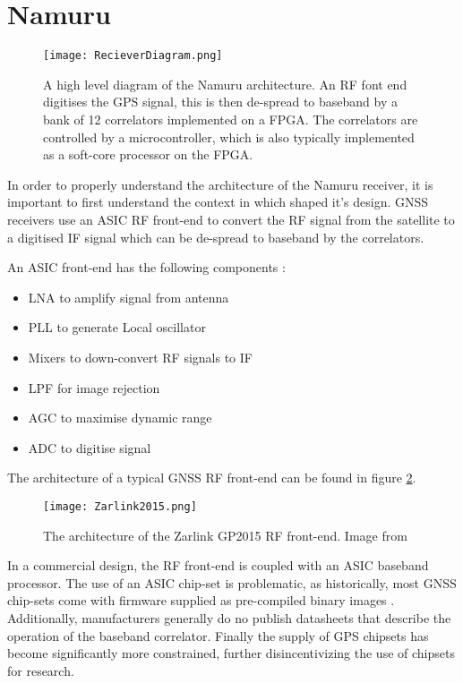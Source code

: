 \section{Namuru}
 

\begin{figure}[!htb] 
    \centering
    \texttt{[image: RecieverDiagram.png]} 
    \caption{A high level diagram of the Namuru architecture. An RF font end digitises the GPS signal, this is then de-spread to baseband by a bank of 12 correlators implemented on a FPGA. The correlators are controlled by a microcontroller, which is also typically implemented as a soft-core processor on the FPGA.}
    \label{fig:RecieverDiagram}
\end{figure}

In order to properly understand the architecture of the Namuru receiver, it is important to first understand the context in which shaped it's design. \ac{GNSS} receivers use an \ac{ASIC} RF front-end to convert the \ac{RF} signal from the satellite to a digitised \ac{IF} signal which can be de-spread to baseband by the correlators. 

An \ac{ASIC} front-end has the following components \cite{GlennonPresentation}: 

\begin{itemize}
\item{\ac{LNA} to amplify signal from antenna}
\item{\ac{PLL} to generate Local oscillator}
\item{Mixers to down-convert RF signals to IF}
\item{\ac{LPF} for image rejection}
\item{\ac{AGC} to maximise dynamic range}
\item{\ac{ADC} to digitise signal}
\end{itemize}

The architecture of a typical \ac{GNSS} \ac{RF} front-end can be found in figure \ref{fig:Zarlink2015}.  

\begin{figure}[!htb] 
    \centering
    \texttt{[image: Zarlink2015.png]} 
    \caption{The architecture of the Zarlink GP2015 \ac{RF} front-end. Image from \cite{Zarlink2015}}
    \label{fig:Zarlink2015}
\end{figure}

In a commercial design, the RF front-end is coupled with an ASIC baseband processor. The use of an ASIC chip-set is problematic, as historically, most \ac{GNSS} chip-sets come with firmware supplied as pre-compiled binary images \cite{Glennon11aquariusfirmware}. 
Additionally, manufacturers generally do no publish datasheets that describe the operation of the baseband correlator\cite{Glennon11aquariusfirmware}. Finally the supply of GPS chipsets has become significantly more constrained, further disincentivizing the use of chipsets for research.

